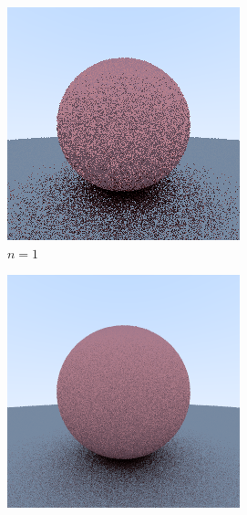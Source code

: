 \documentclass[10pt]{IEEEtran}
\begin{document}
\begin{figure}
    \caption{The effect of sample count on image quality. Each image is rendered with $n$ samples
    per pixel.}
    \label{fig:samples}
    \centering
    \begin{subfigure}[b]{0.2\textwidth}
        \centering
        \includegraphics[width=\textwidth]{images/sampleCount/1.png}
        \caption{$n=1$}
        \label{fig:samples n equals 1}
    \end{subfigure}
    \begin{subfigure}[b]{0.2\textwidth}
        \centering
        \includegraphics[width=\textwidth]{images/sampleCount/10.png}

\end{subfigure}
\end{figure}
\end{document}
